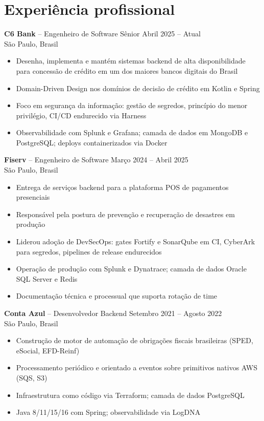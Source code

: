 \documentclass[11pt,a4paper]{article}
\begin{document}
\section{Experiência profissional}

\noindent\textbf{C6 Bank} -- Engenheiro de Software Sênior \hfill Abril 2025 -- Atual\\
São Paulo, Brasil
\begin{itemize}
\item Desenha, implementa e mantém sistemas backend de alta disponibilidade para concessão de crédito em um dos maiores bancos digitais do Brasil
\item Domain-Driven Design nos domínios de decisão de crédito em Kotlin e Spring
\item Foco em segurança da informação: gestão de segredos, princípio do menor privilégio, CI/CD endurecido via Harness
\item Observabilidade com Splunk e Grafana; camada de dados em MongoDB e PostgreSQL; deploys containerizados via Docker
\end{itemize}

\noindent\textbf{Fiserv} -- Engenheiro de Software \hfill Março 2024 -- Abril 2025\\
São Paulo, Brasil
\begin{itemize}
\item Entrega de serviços backend para a plataforma POS de pagamentos presenciais
\item Responsável pela postura de prevenção e recuperação de desastres em produção
\item Liderou adoção de DevSecOps: gates Fortify e SonarQube em CI, CyberArk para segredos, pipelines de release endurecidos
\item Operação de produção com Splunk e Dynatrace; camada de dados Oracle SQL Server e Redis
\item Documentação técnica e processual que suporta rotação de time
\end{itemize}

\noindent\textbf{Conta Azul} -- Desenvolvedor Backend \hfill Setembro 2021 -- Agosto 2022\\
São Paulo, Brasil
\begin{itemize}
\item Construção de motor de automação de obrigações fiscais brasileiras (SPED, eSocial, EFD-Reinf)
\item Processamento periódico e orientado a eventos sobre primitivos nativos AWS (SQS, S3)
\item Infraestrutura como código via Terraform; camada de dados PostgreSQL
\item Java 8/11/15/16 com Spring; observabilidade via LogDNA
\end{itemize}
\end{document}
